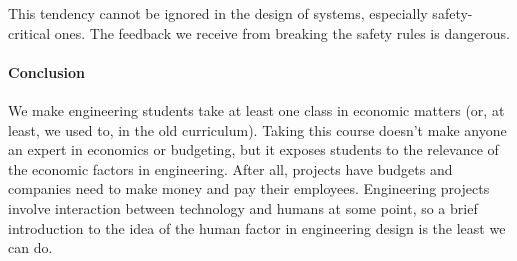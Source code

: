 This tendency cannot be ignored in the design of systems, especially safety-critical ones. The feedback we receive from breaking the safety rules is dangerous.



\paragraph{Conclusion}
We make engineering students take at least one class in economic matters (or, at least, we used to, in the old curriculum). Taking this course doesn't make anyone an expert in economics or budgeting, but it exposes students to the relevance of the economic factors in engineering. After all, projects have budgets and companies need to make money and pay their employees. Engineering projects involve interaction between technology and humans at some point, so a brief introduction to the idea of the human factor in engineering design is the least we can do.





